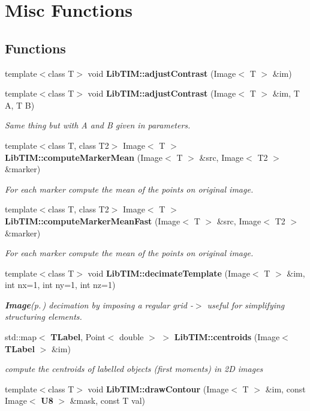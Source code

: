 \section{Misc Functions}
\label{group__misc}
\subsection*{Functions}
\begin{CompactItemize}
\item 
template$<$class T$>$ void {\bf Lib\-TIM::adjust\-Contrast} (Image$<$ T $>$ \&im)
\item 
template$<$class T$>$ void {\bf Lib\-TIM::adjust\-Contrast} (Image$<$ T $>$ \&im, T A, T B)
\begin{CompactList}\small\item\em Same thing but with A and B given in parameters. \item\end{CompactList}\item 
template$<$class T, class T2$>$ Image$<$ T $>$ {\bf Lib\-TIM::compute\-Marker\-Mean} (Image$<$ T $>$ \&src, Image$<$ T2 $>$ \&marker)
\begin{CompactList}\small\item\em For each marker compute the mean of the points on original image. \item\end{CompactList}\item 
template$<$class T, class T2$>$ Image$<$ T $>$ {\bf Lib\-TIM::compute\-Marker\-Mean\-Fast} (Image$<$ T $>$ \&src, Image$<$ T2 $>$ \&marker)
\begin{CompactList}\small\item\em For each marker compute the mean of the points on original image. \item\end{CompactList}\item 
template$<$class T$>$ void {\bf Lib\-TIM::decimate\-Template} (Image$<$ T $>$ \&im, int nx=1, int ny=1, int nz=1)
\begin{CompactList}\small\item\em {\bf Image}{\rm (p.\,\pageref{classLibTIM_1_1Image})} decimation by imposing a regular grid -$>$ useful for simplifying structuring elements. \item\end{CompactList}\item 
std::map$<$ {\bf TLabel}, Point$<$ double $>$ $>$ {\bf Lib\-TIM::centroids} (Image$<$ {\bf TLabel} $>$ \&im)
\begin{CompactList}\small\item\em compute the centroids of labelled objects (first moments) in 2D images \item\end{CompactList}\item 
template$<$class T$>$ void {\bf Lib\-TIM::draw\-Contour} (Image$<$ T $>$ \&im, const Image$<$ {\bf U8} $>$ \&mask, const T val)
\end{CompactItemize}


